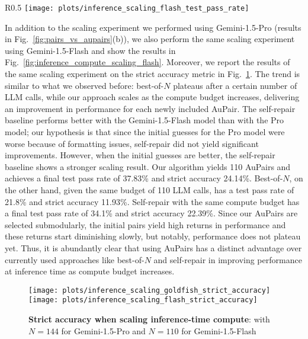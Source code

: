 \documentclass[11pt, a4paper, logo, copyright]{googledeepmind}
\def\aupair/{\textcolor{golden}{Au}Pair}
\def\aupairs/{\textcolor{golden}{Au}Pairs}
\begin{document}
\begin{wrapfigure}{R}{0.5\linewidth}
    \centering
        \texttt{[image: plots/inference\_scaling\_flash\_test\_pass\_rate]}
    \caption{Scaling up inference compute on the CodeForces dataset with Gemini-1.5-Flash. Scores correspond to average pass test rate on all the test problems.}
    \label{fig:inference_compute_scaling_flash}
\end{wrapfigure}

In addition to the scaling experiment we performed using Gemini-1.5-Pro (results in Fig.~\ref{fig:pairs_vs_aupairs}(b)), we also perform the same scaling experiment using Gemini-1.5-Flash and show the results in Fig.~\ref{fig:inference_compute_scaling_flash}. Moreover, we report the results of the same scaling experiment on the strict accuracy metric in Fig.~\ref{fig:inference_compute_scaling_strict_accuracy}. The trend is similar to what we observed before: best-of-$N$ plateaus after a certain number of LLM calls, while our approach scales as the compute budget increases, delivering an improvement in performance for each newly included \aupair/. The self-repair baseline performs better with the Gemini-1.5-Flash model than with the Pro model; our hypothesis is that since the initial guesses for the Pro model were worse because of formatting issues, self-repair did not yield significant improvements. However, when the initial guesses are better, the self-repair baseline shows a stronger scaling result. Our algorithm yields 110 \aupairs/ and achieves a final test pass rate of 37.83\% and strict accuracy 24.14\%. Best-of-$N$, on the other hand, given the same budget of 110 LLM calls, has a test pass rate of 21.8\% and strict accuracy 11.93\%. Self-repair with the same compute budget has a final test pass rate of 34.1\% and strict accuracy 22.39\%. Since our \aupairs/ are selected submodularly, the initial pairs yield high returns in performance and these returns start diminishing slowly, but notably, performance does not plateau yet. Thus, it is abundantly clear that using \aupairs/ has a distinct advantage over currently used approaches like best-of-$N$ and self-repair in improving performance at inference time as compute budget increases.

\begin{figure}[t!]
    \centering
    \texttt{[image: plots/inference\_scaling\_goldfish\_strict\_accuracy]}
    \texttt{[image: plots/inference\_scaling\_flash\_strict\_accuracy]}
    \caption{\textbf{Strict accuracy when scaling inference-time compute}: with $N = 144$ for Gemini-1.5-Pro and $N = 110$ for Gemini-1.5-Flash}
    \label{fig:inference_compute_scaling_strict_accuracy}
\end{figure}
\end{document}
